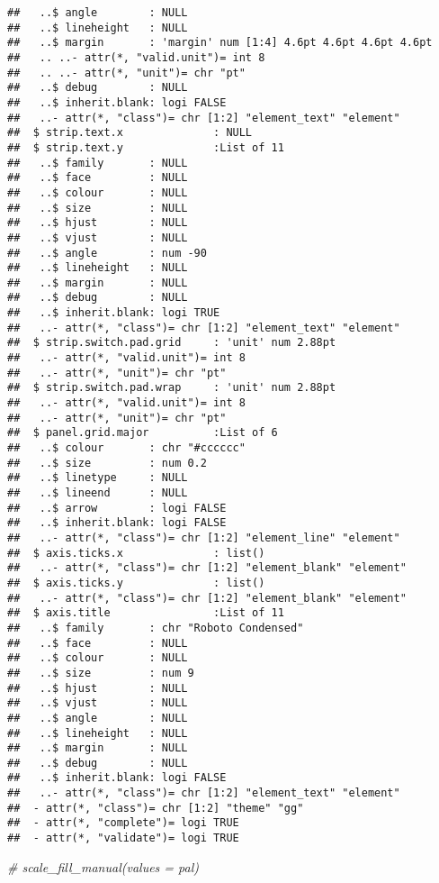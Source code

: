 \documentclass[
]{article}
\newenvironment{Shaded}{\begin{snugshade}}{\end{snugshade}}
\newcommand{\CommentTok}[1]{\textcolor[rgb]{0.56,0.35,0.01}{\textit{#1}}}
\begin{document}
\begin{verbatim}
##   ..$ angle        : NULL
##   ..$ lineheight   : NULL
##   ..$ margin       : 'margin' num [1:4] 4.6pt 4.6pt 4.6pt 4.6pt
##   .. ..- attr(*, "valid.unit")= int 8
##   .. ..- attr(*, "unit")= chr "pt"
##   ..$ debug        : NULL
##   ..$ inherit.blank: logi FALSE
##   ..- attr(*, "class")= chr [1:2] "element_text" "element"
##  $ strip.text.x              : NULL
##  $ strip.text.y              :List of 11
##   ..$ family       : NULL
##   ..$ face         : NULL
##   ..$ colour       : NULL
##   ..$ size         : NULL
##   ..$ hjust        : NULL
##   ..$ vjust        : NULL
##   ..$ angle        : num -90
##   ..$ lineheight   : NULL
##   ..$ margin       : NULL
##   ..$ debug        : NULL
##   ..$ inherit.blank: logi TRUE
##   ..- attr(*, "class")= chr [1:2] "element_text" "element"
##  $ strip.switch.pad.grid     : 'unit' num 2.88pt
##   ..- attr(*, "valid.unit")= int 8
##   ..- attr(*, "unit")= chr "pt"
##  $ strip.switch.pad.wrap     : 'unit' num 2.88pt
##   ..- attr(*, "valid.unit")= int 8
##   ..- attr(*, "unit")= chr "pt"
##  $ panel.grid.major          :List of 6
##   ..$ colour       : chr "#cccccc"
##   ..$ size         : num 0.2
##   ..$ linetype     : NULL
##   ..$ lineend      : NULL
##   ..$ arrow        : logi FALSE
##   ..$ inherit.blank: logi FALSE
##   ..- attr(*, "class")= chr [1:2] "element_line" "element"
##  $ axis.ticks.x              : list()
##   ..- attr(*, "class")= chr [1:2] "element_blank" "element"
##  $ axis.ticks.y              : list()
##   ..- attr(*, "class")= chr [1:2] "element_blank" "element"
##  $ axis.title                :List of 11
##   ..$ family       : chr "Roboto Condensed"
##   ..$ face         : NULL
##   ..$ colour       : NULL
##   ..$ size         : num 9
##   ..$ hjust        : NULL
##   ..$ vjust        : NULL
##   ..$ angle        : NULL
##   ..$ lineheight   : NULL
##   ..$ margin       : NULL
##   ..$ debug        : NULL
##   ..$ inherit.blank: logi FALSE
##   ..- attr(*, "class")= chr [1:2] "element_text" "element"
##  - attr(*, "class")= chr [1:2] "theme" "gg"
##  - attr(*, "complete")= logi TRUE
##  - attr(*, "validate")= logi TRUE
\end{verbatim}

\begin{Shaded}
\begin{Highlighting}[]
  \CommentTok{# scale_fill_manual(values = pal)}
\end{Highlighting}
\end{Shaded}
\end{document}
